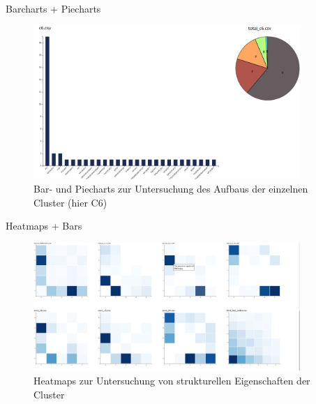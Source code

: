 \documentclass[compress,12pt]{beamer}
\begin{document}
    \begin{frame}{Barcharts + Piecharts}
        \begin{figure}
            \centering
            \includegraphics[width=0.9\textwidth]{../images/bar-pie-charts-example}
            \caption{Bar- und Piecharts zur Untersuchung des Aufbaus der einzelnen Cluster (hier C6)}
            \label{fig:bar-pie-charts-example}
        \end{figure}
    \end{frame}

    \begin{frame}{Heatmaps + Bars}
        \begin{figure}
            \centering
            \includegraphics[width=0.9\textwidth]{../images/heatmaps-example}
            \caption{Heatmaps zur Untersuchung von strukturellen Eigenschaften der Cluster}
            \label{fig:heatmaps-example}
        \end{figure}
    \end{frame}
\end{document}
